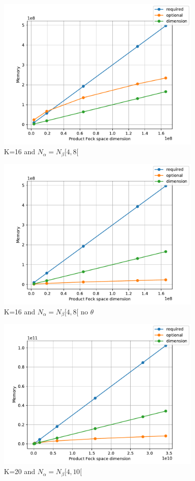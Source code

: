 \documentclass[12p]{article}
\begin{document}
\begin{center}

\begin{figure}
  \centering
  \includegraphics[width=10cm]{graphs/K=16.pdf}
  \caption{K=16 and $N_\alpha = N_\beta [4,8[$}
  \label{}
\end{figure}

\begin{figure}
  \centering
  \includegraphics[width=10cm]{graphs/K=16_low.pdf}
  \caption{K=16 and $N_\alpha = N_\beta [4,8[$ no $\theta$}
  \label{}
\end{figure}

\begin{figure}
  \centering
  \includegraphics[width=10cm]{graphs/K=20.pdf}
  \caption{K=20 and $N_\alpha = N_\beta [4,10[$}
  \label{}
\end{figure}


\end{center}
\end{document}
